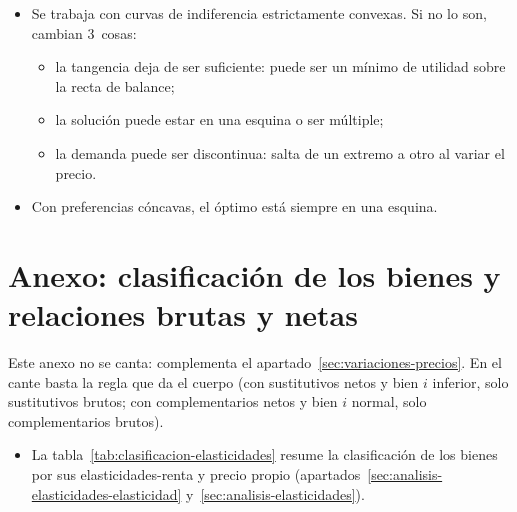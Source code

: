 \documentclass[11pt]{article}
\begin{document}
\begin{itemize}
\item Se trabaja con curvas de indiferencia estrictamente convexas. Si no lo son, cambian 3~cosas:
  \begin{itemize}
  \item la tangencia deja de ser suficiente: puede ser un mínimo de utilidad sobre la recta de balance;
  \item la solución puede estar en una esquina o ser múltiple;
  \item la demanda puede ser discontinua: salta de un extremo a otro al variar el precio.
  \end{itemize}
\item Con preferencias cóncavas, el óptimo está siempre en una esquina.
\end{itemize}

\section{Anexo: clasificación de los bienes\cortetitulo{} y relaciones brutas y netas}\label{anexo:clasificacion}

\begin{notaopositor}
Este anexo no se canta: complementa el apartado~\ref{sec:variaciones-precios}. En el cante basta la regla que da el cuerpo (con sustitutivos netos y bien $i$ inferior, solo sustitutivos brutos; con complementarios netos y bien $i$ normal, solo complementarios brutos).
\end{notaopositor}

\begin{itemize}
\item La tabla~\ref{tab:clasificacion-elasticidades} resume la clasificación de los bienes por sus elasticidades-renta y precio propio (apartados~\ref{sec:analisis-elasticidades-elasticidad} y~\ref{sec:analisis-elasticidades}).
\end{itemize}
\end{document}
